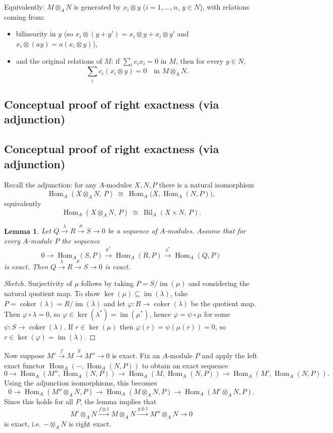 \documentclass[11pt,a4paper]{article}
\theoremstyle{definition}
\theoremstyle{plain}
\newtheorem{lemma}[definition]{Lemma}
\theoremstyle{remark}
\newcommand{\Bil}{\operatorname{Bil}}
\newcommand{\Hom}{\operatorname{Hom}}
\newcommand{\im}{\operatorname{im}}
\newcommand{\coker}{\operatorname{coker}}
\begin{document}
Equivalently: $M\otimes_A N$ is generated by $x_i\otimes y$ ($i=1,\dots,n$, $y\in N$),
with relations coming from:
\begin{itemize}
\item bilinearity in $y$ (so $x_i\otimes (y+y')=x_i\otimes y+x_i\otimes y'$ and $x_i\otimes (ay)=a(x_i\otimes y)$),
\item and the original relations of $M$: if $\sum_i c_i x_i=0$ in $M$, then for every $y\in N$,
\[
\sum_i c_i (x_i\otimes y)=0 \quad \text{in } M\otimes_A N.
\]
\end{itemize}

\subsection*{Conceptual proof of right exactness (via adjunction)}

\subsection*{Conceptual proof of right exactness (via adjunction)}

Recall the adjunction: for any $A$-modules $X,N,P$ there is a natural isomorphism
\[
\Hom_A(X\otimes_A N,\,P)\ \cong\ \Hom_A\big(X,\Hom_A(N,P)\big),
\]
equivalently
\[
\Hom_A(X\otimes_A N,\,P)\ \cong\ \Bil_A(X\times N,\,P).
\]

\begin{lemma}
Let $Q \xrightarrow{\lambda} R \xrightarrow{\mu} S \to 0$ be a sequence of $A$-modules.
Assume that for every $A$-module $P$ the sequence
\[
0 \to \Hom_A(S,P) \xrightarrow{\mu^*} \Hom_A(R,P) \xrightarrow{\lambda^*} \Hom_A(Q,P)
\]
is exact. Then $Q \xrightarrow{\lambda} R \xrightarrow{\mu} S \to 0$ is exact.
\end{lemma}

\begin{proof}[Sketch]
Surjectivity of $\mu$ follows by taking $P=S/\im(\mu)$ and considering the natural quotient map.
To show $\ker(\mu)\subseteq \im(\lambda)$, take $P=\coker(\lambda)=R/\im(\lambda)$ and let
$\varphi:R\to \coker(\lambda)$ be the quotient map. Then $\varphi\circ\lambda=0$, so
$\varphi\in\ker(\lambda^*)=\im(\mu^*)$, hence $\varphi=\psi\circ\mu$ for some $\psi:S\to\coker(\lambda)$.
If $r\in\ker(\mu)$ then $\varphi(r)=\psi(\mu(r))=0$, so $r\in\ker(\varphi)=\im(\lambda)$.
\end{proof}

Now suppose $M' \xrightarrow{f} M \xrightarrow{g} M'' \to 0$ is exact.
Fix an $A$-module $P$ and apply the left exact functor
$\Hom_A(-,\Hom_A(N,P))$ to obtain an exact sequence
\[
0\to \Hom_A(M'',\Hom_A(N,P))
\to \Hom_A(M,\Hom_A(N,P))
\to \Hom_A(M',\Hom_A(N,P)).
\]
Using the adjunction isomorphisms, this becomes
\[
0\to \Hom_A(M''\otimes_A N,P)
\to \Hom_A(M\otimes_A N,P)
\to \Hom_A(M'\otimes_A N,P).
\]
Since this holds for all $P$, the lemma implies that
\[
M'\otimes_A N \xrightarrow{f\otimes 1} M\otimes_A N \xrightarrow{g\otimes 1} M''\otimes_A N \to 0
\]
is exact, i.e. $-\otimes_A N$ is right exact.
\end{document}
